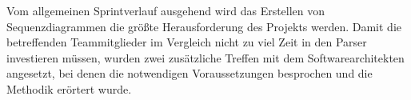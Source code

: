 Vom allgemeinen Sprintverlauf ausgehend wird das Erstellen von Sequenzdiagrammen die größte Herausforderung des Projekts werden. Damit die betreffenden Teammitglieder im Vergleich nicht zu viel Zeit in den Parser investieren müssen, wurden zwei zusätzliche Treffen mit dem Softwarearchitekten angesetzt, bei denen die notwendigen Voraussetzungen besprochen und die Methodik erörtert wurde.
\nsecend%
